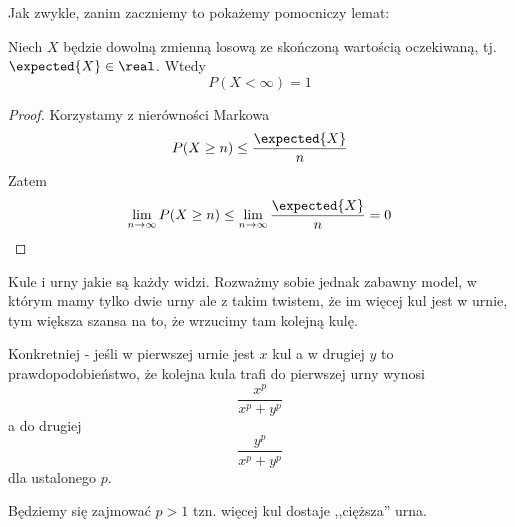 
Jak zwykle, zanim zaczniemy to pokażemy pomocniczy lemat:
\begin{lemma}
    \label{if-expected-is-finite-then-variable-is-finite}
    Niech \( X \) będzie dowolną zmienną losową ze skończoną wartością oczekiwaną, tj. \( \expected{X} \in \real \).
    Wtedy
    \[
        P(X < \infty) = 1
    \]
\end{lemma}
\begin{proof}
    Korzystamy z nierówności Markowa
    \[
        P(X \geq n) \leq \frac{\expected{X}}{n}
    \]
    Zatem
    \[
        \lim_{n \rightarrow \infty} P(X \geq n) \leq \lim_{n \rightarrow \infty} \frac{\expected{X}}{n} = 0
    \]
\end{proof}


Kule i urny jakie są każdy widzi. Rozważmy sobie jednak zabawny model, w którym mamy tylko dwie urny ale z takim twistem, że im więcej kul jest w urnie, tym większa szansa na to, że wrzucimy tam kolejną kulę.

Konkretniej - jeśli w pierwszej urnie jest \( x \) kul a w drugiej \( y \) to prawdopodobieństwo, że kolejna kula trafi do pierwszej urny wynosi \[ \frac{x^p}{x^p + y^p} \] a do drugiej \[ \frac{y^p}{x^p + y^p} \] 
dla ustalonego \( p \).

Będziemy się zajmować \( p > 1 \) tzn. więcej kul dostaje ,,cięższa'' urna.

